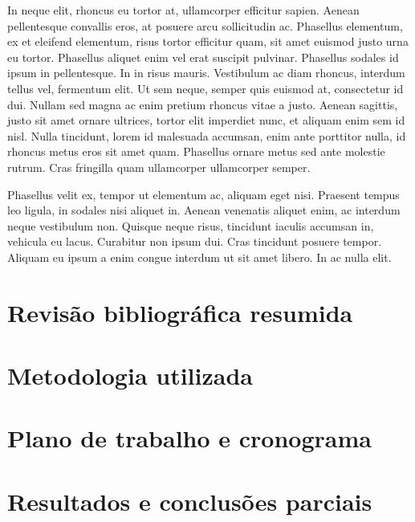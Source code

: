 \documentclass{tufte-handout}
\begin{document}
In neque elit, rhoncus eu tortor at, ullamcorper efficitur sapien. Aenean pellentesque convallis eros, at posuere arcu sollicitudin ac. Phasellus elementum, ex et eleifend elementum, risus tortor efficitur quam, sit amet euismod justo urna eu tortor. Phasellus aliquet enim vel erat suscipit pulvinar. Phasellus sodales id ipsum in pellentesque. In in risus mauris. Vestibulum ac diam rhoncus, interdum tellus vel, fermentum elit. Ut sem neque, semper quis euismod at, consectetur id dui. Nullam sed magna ac enim pretium rhoncus vitae a justo. Aenean sagittis, justo sit amet ornare ultrices, tortor elit imperdiet nunc, et aliquam enim sem id nisl. Nulla tincidunt, lorem id malesuada accumsan, enim ante porttitor nulla, id rhoncus metus eros sit amet quam. Phasellus ornare metus sed ante molestie rutrum. Cras fringilla quam ullamcorper ullamcorper semper.

Phasellus velit ex, tempor ut elementum ac, aliquam eget nisi. Praesent tempus leo ligula, in sodales nisi aliquet in. Aenean venenatis aliquet enim, ac interdum neque vestibulum non. Quisque neque risus, tincidunt iaculis accumsan in, vehicula eu lacus. Curabitur non ipsum dui. Cras tincidunt posuere tempor. Aliquam eu ipsum a enim congue interdum ut sit amet libero. In ac nulla elit. 

\section{Revisão bibliográfica resumida}\label{sec:revisao_bibliografica}

\section{Metodologia utilizada}\label{sec:metodologia}

\section{Plano de trabalho e cronograma}\label{sec:plano_de_trabalho}

\section{Resultados e conclusões parciais}\label{sec:resultados}




\end{document}

